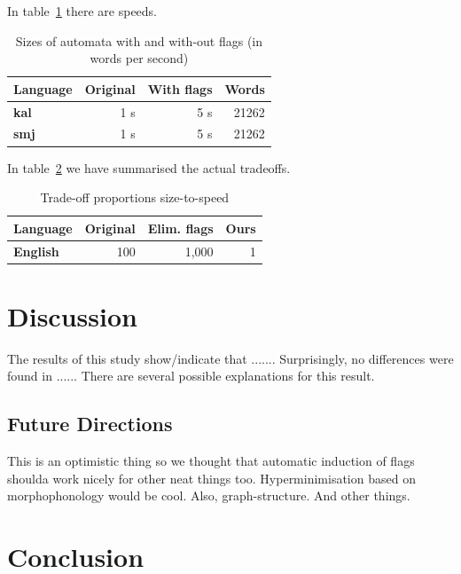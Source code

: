 \documentclass[11pt]{article}
\begin{document}
In table~\ref{table:speed} there are speeds.

\begin{table}
    \centering
    \begin{tabular}{|l|r|r|r|}
        \hline
        \bf Language & \bf Original & \bf With flags & \bf Words \\
        \hline
        \bf kal & 1 s & 5 s  & 21262  \\
        \bf smj & 1 s & 5 s  & 21262  \\
        
        \hline
    \end{tabular}
    \caption{Sizes of automata with and with-out flags (in words per second)
    \label{table:speed}}
\end{table}

In table~\ref{table:tradeoff} we have summarised the actual tradeoffs.

\begin{table}
    \centering
    \begin{tabular}{|l|r|r|r|}
        \hline
        \bf Language & \bf Original & \bf Elim. flags & \bf Ours \\
        \hline
        \bf English & 100 & 1,000 & 1  \\
        \hline
    \end{tabular}
    \caption{Trade-off proportions size-to-speed
    \label{table:tradeoff}}
\end{table}


\section{Discussion}
\label{sec:discussion}

The results of this study show/indicate that .......
Surprisingly, no differences were found in ......
There are several possible explanations for this result.

\subsection{Future Directions}
\label{subsec:future-directions}

This is an optimistic thing so we thought that automatic induction of flags
shoulda work nicely for other neat things too. Hyperminimisation based on
morphophonology would be cool. Also, graph-structure. And other things.

\section{Conclusion}
\label{sec:conclusion}
\end{document}
